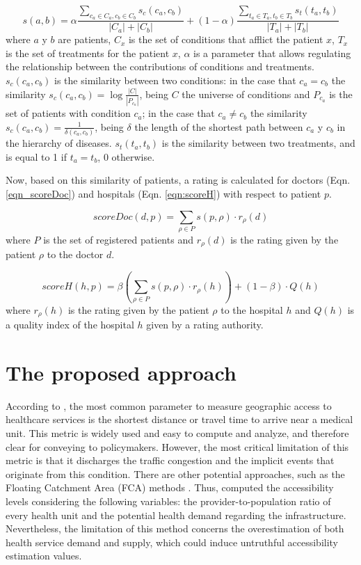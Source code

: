 \documentclass[sustainability,article,submit,pdftex,moreauthors]{Definitions/mdpi}
\begin{document}
\begin{equation}
	\label{eqn:sim_pacientes}
	s(a,b)  = \alpha \frac{\sum_{c_a\in C_a,c_b\in C_b} s_c(c_a, c_b)}{|C_a|+|C_b|} + (1-\alpha)\frac{\sum_{t_a\in T_a,t_b\in T_b} s_t(t_a, t_b)}{|T_a|+|T_b|}
\end{equation}
where $a$ y $b$ are patients, $C_x$ is the set of conditions that afflict the patient $x$, $T_x$ is the set of treatments for the patient $x$, $\alpha$ is a parameter that allows regulating the relationship between the contributions of conditions and treatments. $s_c(c_a, c_b)$ is the similarity between two conditions: in the case that $c_a = c_b$ the similarity $s_c(c_a, c_b) = \log \frac{|C|}{|P_{c_a}|}$, being $C$ the universe of conditions and $P_{c_a}$ is the set of patients with condition $c_a$; in the case that $c_a \neq c_b$ the similarity $s_c(c_a, c_b) = \frac{1}{\delta (c_a,c_b)}$, being $\delta$ the length of the shortest path between $c_a$ y $c_b$ in the hierarchy of diseases. $s_t(t_a, t_b)$ is the similarity between two treatments, and is equal to 1 if $t_a = t_b$, 0 otherwise.

Now, based on this similarity of patients, a rating is calculated for doctors (Eqn. \ref{eqn_scoreDoc}) and hospitals (Eqn. \ref{eqn:scoreH}) with respect to patient $p$.

\begin{equation}
	\label{eqn_scoreDoc}
	scoreDoc(d,p) = \sum_{\rho \in P}s(p,\rho)\cdot r_\rho (d)
\end{equation}
where $P$ is the set of registered patients and $r_\rho (d)$ is the rating given by the patient $\rho$ to the doctor $d$.

\begin{equation}
	\label{eqn:scoreH}
	scoreH(h,p) = \beta \left( \sum_{\rho \in P} s(p, \rho) \cdot r_\rho(h) \right) + (1-\beta) \cdot Q(h)
\end{equation}
where $r_\rho (h)$ is the rating given by the patient $\rho$ to the hospital $h$ and $Q(h)$ is a quality index of the hospital $h$ given by a rating authority.


\section{The proposed approach}

According to \citet{neutens2015accessibility}, the most common parameter to measure geographic access to healthcare services is the shortest distance or travel time to arrive near a medical unit. This metric is widely used and easy to compute and analyze, and therefore clear for conveying to policymakers. However, the most critical limitation of this metric is that it discharges the traffic congestion and the implicit events that originate from this condition. There are other potential approaches, such as the Floating Catchment Area (FCA) methods \citep{matthews2019using}. Thus, \citet{matthews2019using} computed the accessibility levels considering the following variables: the provider-to-population ratio of every health unit and the potential health demand regarding the infrastructure. Nevertheless, the limitation of this method concerns the overestimation of both health service demand and supply, which could induce untruthful accessibility estimation values.
\end{document}
